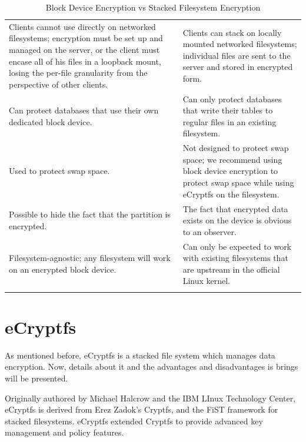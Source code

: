 \begin{center}
\begin{table}[tp]
\begin{tabularx}{\textwidth}{|| m{} || m{} ||}
		\hhline{|:=::=:|}
		Clients cannot use directly on networked filesystems; encryption must be set up and managed on the server, or the client must encase all of his files in a loopback mount, losing the per-file granularity from the perspective of other clients. & Clients can stack on locally mounted networked filesystems; individual files are sent to the server and stored in encrypted form. \\
		\hhline{|:=::=:|}
		Can protect databases that use their own dedicated block device. & Can only protect databases that write their tables to regular files in an existing filesystem. \\
		\hhline{|:=::=:|}
		Used to protect swap space. & Not designed to protect swap space; we recommend using block device encryption to protect swap space while using eCryptfs on the filesystem. \\
		\hhline{|:=::=:|}
		Possible to hide the fact that the partition is encrypted. & The fact that encrypted data exists on the device is obvious to an observer. \\
		\hhline{|:=::=:|}
		Filesystem-agnostic; any filesystem will work on an encrypted block device. & Can only be expected to work with existing filesystems that are upstream in the official Linux kernel. \\
		\hhline{|b:=:b:=:b|}
	\end{tabularx}
	\caption{Block Device Encryption vs Stacked Filesystem Encryption}
\end{table}
\end{center}
\newpage

\section{eCryptfs}
\label{sec:de-ecryptfs}

As mentioned before, eCryptfs is a stacked file system which manages data encryption. Now, details about it and the advantages and disadvantages is brings will be presented.

Originally authored by Michael Halcrow and the IBM LInux Technology Center, eCryptfs is derived from Erez Zadok's Cryptfs, and the FiST framework for stacked filesystems. eCryptfs extended Cryptfs to provide advanced key management and policy features. 
